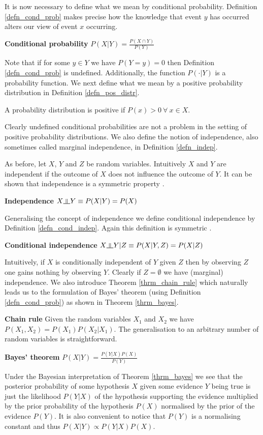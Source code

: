 It is now necessary to define what we mean by conditional probability. Definition \ref{defn_cond_prob} makes precise how the knowledge that event $y$ has occurred alters our view of event $x$ occurring.  
\begin{defn}
\textbf{Conditional probability} $P(X|Y) = \frac{P(X \cap Y)}{P(Y)}$ 
\label{defn_cond_prob}
\end{defn}
Note that if for some $y \in Y$ we have $P(Y=y) = 0$ then Definition \ref{defn_cond_prob} is undefined. Additionally, the function $P(\cdot|Y)$ is a probability function. We next define what we mean by a positive probability distribution in Definition \ref{defn_pos_distr}.
\begin{defn}
A probability distribution is positive if $P(x) > 0~\forall~x \in X$.
\label{defn_pos_distr}
\end{defn}
Clearly undefined conditional probabilities are not a problem in the setting of positive probability distributions. We also define the notion of independence, also sometimes called marginal independence, in Definition \ref{defn_indep}. 

As before, let $X$, $Y$ and $Z$ be random variables. Intuitively $X$ and $Y$ are independent if the outcome of $X$ does not influence the outcome of $Y$. It can be shown that independence is a symmetric property \cite{koller}.
\begin{defn}
\textbf{Independence} $X \indep Y \equiv P(X|Y) = P(X)$ 
\label{defn_indep}
\end{defn}
Generalising the concept of independence we define conditional independence by Definition \ref{defn_cond_indep}. Again this definition is symmetric \cite{koller}.
\begin{defn}
\textbf{Conditional independence} $X \indep Y | Z \equiv P(X|Y,Z) = P(X|Z)$
\label{defn_cond_indep}
\end{defn}
Intuitively, if $X$ is conditionally independent of $Y$ given $Z$ then by observing $Z$ one gains nothing by observing $Y$. Clearly if $Z=\emptyset$ we have (marginal) independence. We also introduce Theorem \ref{thrm_chain_rule} which naturally leads us to the formulation of Bayes' theorem (using Definition \ref{defn_cond_prob}) as shown in Theorem \ref{thrm_bayes}. 
\begin{thrm}
\label{thrm_chain_rule}  
\textbf{Chain rule} Given the random variables $X_1$ and $X_2$ we have $P(X_1,X_2) = P(X_1)P(X_2|X_1)$. The generalisation to an arbitrary number of random variables is straightforward.
\end{thrm}
\begin{thrm}
\textbf{Bayes' theorem} $P(X|Y) = \frac{P(Y|X)P(X)}{P(Y)}$
\label{thrm_bayes}
\end{thrm}
Under the Bayesian interpretation of Theorem \ref{thrm_bayes} we see that the posterior probability of some hypothesis $X$ given some evidence $Y$ being true is just the likelihood $P(Y|X)$ of the hypothesis supporting the evidence multiplied by the prior probability of the hypothesis $P(X)$ normalised by the prior of the evidence $P(Y)$. It is also convenient to notice that $P(Y)$ is a normalising constant and thus  $P(X|Y) \propto P(Y|X)P(X)$.

